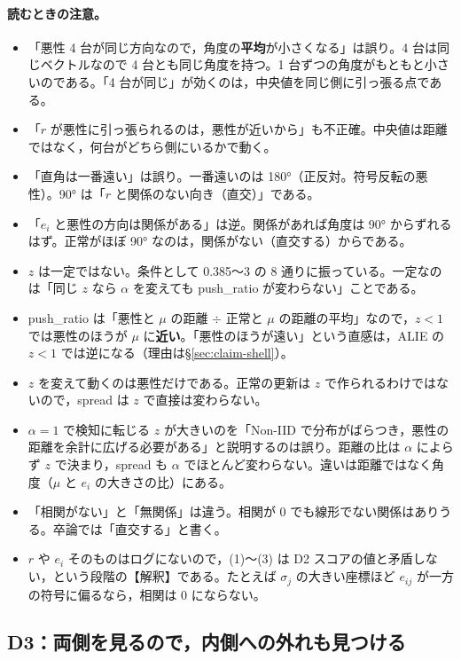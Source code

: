 \documentclass[a4j, dvipdfmx]{jsarticle}  %
\begin{document}
\paragraph{読むときの注意。}
\begin{itemize}
  \item 「悪性 4 台が同じ方向なので，角度の\textbf{平均}が小さくなる」は誤り。4 台は同じベクトルなので 4 台とも同じ角度を持つ。1 台ずつの角度がもともと小さいのである。「4 台が同じ」が効くのは，中央値を同じ側に引っ張る点である。
  \item 「$r$ が悪性に引っ張られるのは，悪性が近いから」も不正確。中央値は距離ではなく，何台がどちら側にいるかで動く。
  \item 「直角は一番遠い」は誤り。一番遠いのは 180°（正反対。符号反転の悪性）。90° は「$r$ と関係のない向き（直交）」である。
  \item 「$e_i$ と悪性の方向は関係がある」は逆。関係があれば角度は 90° からずれるはず。正常がほぼ 90° なのは，関係がない（直交する）からである。
  \item $z$ は一定ではない。条件として 0.385〜3 の 8 通りに振っている。一定なのは「同じ $z$ なら $\alpha$ を変えても push\_ratio が変わらない」ことである。
  \item push\_ratio は「悪性と $\mu$ の距離 $\div$ 正常と $\mu$ の距離の平均」なので，$z < 1$ では悪性のほうが $\mu$ に\textbf{近い}。「悪性のほうが遠い」という直感は，ALIE の $z < 1$ では逆になる（理由は\S\ref{sec:claim-shell}）。
  \item $z$ を変えて動くのは悪性だけである。正常の更新は $z$ で作られるわけではないので，spread は $z$ で直接は変わらない。
  \item $\alpha = 1$ で検知に転じる $z$ が大きいのを「Non-IID で分布がばらつき，悪性の距離を余計に広げる必要がある」と説明するのは誤り。距離の比は $\alpha$ によらず $z$ で決まり，spread も $\alpha$ でほとんど変わらない。違いは距離ではなく角度（$\mu$ と $e_i$ の大きさの比）にある。
  \item 「相関がない」と「無関係」は違う。相関が 0 でも線形でない関係はありうる。卒論では「直交する」と書く。
  \item $r$ や $e_i$ そのものはログにないので，(1)〜(3) は D2 スコアの値と矛盾しない，という段階の【解釈】である。たとえば $\sigma_j$ の大きい座標ほど $e_{ij}$ が一方の符号に偏るなら，相関は 0 にならない。
\end{itemize}

\subsection{D3：両側を見るので，内側への外れも見つける}
\label{sec:claim-alie-d3}
\end{document}
